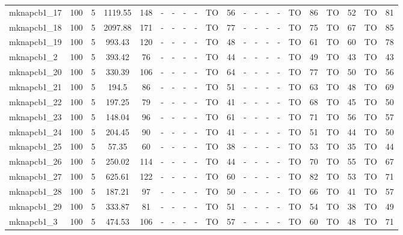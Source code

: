 \begin{sidewaystable}[!ht]
{\begin{tabular}{lcccccccccccccccccccc}
mknapcb1\_17 & 100 & 5 &  \textcolor{blue2}{1119.55} & 148 &  - &  - &  - &  - & TO & 56 &  - &  - &  - &  - & TO & 86 & TO & 52 & TO & 81 \\
mknapcb1\_18 & 100 & 5 &  \textcolor{blue2}{2097.88} & 171 &  - &  - &  - &  - & TO & 77 &  - &  - &  - &  - & TO & 75 & TO & 67 & TO & 85 \\
mknapcb1\_19 & 100 & 5 &  \textcolor{blue2}{993.43} & 120 &  - &  - &  - &  - & TO & 48 &  - &  - &  - &  - & TO & 61 & TO & 60 & TO & 78 \\
mknapcb1\_2 & 100 & 5 &  \textcolor{blue2}{393.42} & 76 &  - &  - &  - &  - & TO & 44 &  - &  - &  - &  - & TO & 49 & TO & 43 & TO & 43 \\
mknapcb1\_20 & 100 & 5 &  \textcolor{blue2}{330.39} & 106 &  - &  - &  - &  - & TO & 64 &  - &  - &  - &  - & TO & 77 & TO & 50 & TO & 56 \\
mknapcb1\_21 & 100 & 5 &  \textcolor{blue2}{194.5} & 86 &  - &  - &  - &  - & TO & 51 &  - &  - &  - &  - & TO & 63 & TO & 48 & TO & 69 \\
mknapcb1\_22 & 100 & 5 &  \textcolor{blue2}{197.25} & 79 &  - &  - &  - &  - & TO & 41 &  - &  - &  - &  - & TO & 68 & TO & 45 & TO & 50 \\
mknapcb1\_23 & 100 & 5 &  \textcolor{blue2}{148.04} & 96 &  - &  - &  - &  - & TO & 61 &  - &  - &  - &  - & TO & 71 & TO & 56 & TO & 57 \\
mknapcb1\_24 & 100 & 5 &  \textcolor{blue2}{204.45} & 90 &  - &  - &  - &  - & TO & 41 &  - &  - &  - &  - & TO & 51 & TO & 44 & TO & 50 \\
mknapcb1\_25 & 100 & 5 &  \textcolor{blue2}{57.35} & 60 &  - &  - &  - &  - & TO & 38 &  - &  - &  - &  - & TO & 53 & TO & 35 & TO & 44 \\
mknapcb1\_26 & 100 & 5 &  \textcolor{blue2}{250.02} & 114 &  - &  - &  - &  - & TO & 44 &  - &  - &  - &  - & TO & 70 & TO & 55 & TO & 67 \\
mknapcb1\_27 & 100 & 5 &  \textcolor{blue2}{625.61} & 122 &  - &  - &  - &  - & TO & 60 &  - &  - &  - &  - & TO & 82 & TO & 53 & TO & 71 \\
mknapcb1\_28 & 100 & 5 &  \textcolor{blue2}{187.21} & 97 &  - &  - &  - &  - & TO & 50 &  - &  - &  - &  - & TO & 66 & TO & 41 & TO & 57 \\
mknapcb1\_29 & 100 & 5 &  \textcolor{blue2}{333.87} & 81 &  - &  - &  - &  - & TO & 51 &  - &  - &  - &  - & TO & 54 & TO & 38 & TO & 49 \\
mknapcb1\_3 & 100 & 5 &  \textcolor{blue2}{474.53} & 106 &  - &  - &  - &  - & TO & 57 &  - &  - &  - &  - & TO & 60 & TO & 48 & TO & 71 \\

\end{tabular}}
\end{sidewaystable}
